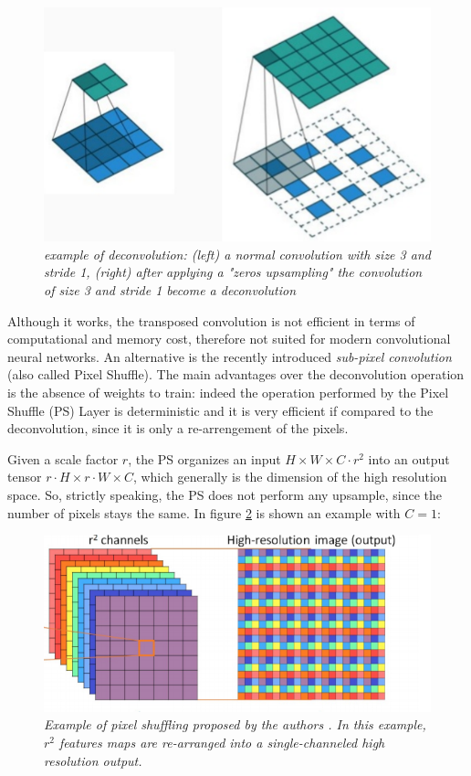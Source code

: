 \documentclass[12pt,a4paper]{report}
\begin{document}
\begin{figure}[h]
 \centering
 \includegraphics[scale=0.35]{./images/deconv.png}
 \caption{\it example of deconvolution: (left) a normal convolution with size 3 and stride 1, (right) after applying a "zeros upsampling" the convolution of size 3 and stride 1 become a deconvolution}
 \label{fig:deconv}
\end{figure}

Although it works, the transposed convolution is not efficient in terms of computational and memory cost, therefore not suited for modern convolutional neural networks. 
An alternative is the recently introduced {\it sub-pixel convolution} \cite{pixelshuffle} (also called Pixel Shuffle). The main advantages over the deconvolution operation is the absence of weights to train: indeed the operation performed by the Pixel Shuffle (PS) Layer is deterministic and it is very efficient if compared to the deconvolution, since it is only a re-arrengement of the pixels. 

Given a scale factor $r$, the PS organizes an input $H \times W \times C \cdot r^2$ into an output tensor $r \cdot H \times r \cdot W \times C$, which generally is the dimension of the high resolution space. 
So, strictly speaking, the PS does not perform any upsample, since the number of pixels stays the same. 
In figure \ref{fig:pixelshuffle1} is shown an example with $C=1$:

\begin{figure}[h]
 \centering
 \includegraphics[scale=0.35]{./images/pixelshuffle.png}
 \caption{\it Example of pixel shuffling proposed by the authors \cite{pixelshuffle}. In this example, $r^2$ features maps are re-arranged into a single-channeled high resolution output.}
 \label{fig:pixelshuffle1}
\end{figure}
\end{document}
